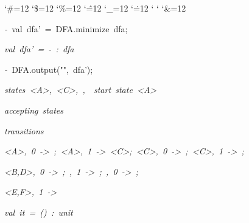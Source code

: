 \begin{list}{}
{\setlength{\leftmargin}{\leftmargini}
\setlength{\rightmargin}{0cm}
\setlength{\itemindent}{0cm}
\setlength{\listparindent}{0cm}
\setlength{\itemsep}{0cm}
\setlength{\parsep}{0cm}
\setlength{\labelsep}{0cm}
\setlength{\labelwidth}{0cm}
\catcode`\#=12
\catcode`\$=12
\catcode`\%=12
\catcode`\^=12
\catcode`\_=12
\catcode`\.=12
\catcode`
\catcode`
\catcode`\&=12
\ttfamily}
\small
\item[]\textsl{-\ }val\ dfa'\ =\ DFA.minimize\ dfa;
\item[]\textsl{val\ dfa'\ =\ -\ :\ dfa}
\item[]\textsl{-\ }DFA.output("",\ dfa');
\item[]\textsl{states\ <A>,\ <C>,\ <B,D>,\ <E,F>\ start\ state\ <A>}
\item[]\textsl{accepting\ states\ <E,F>}
\item[]\textsl{transitions}
\item[]\textsl{<A>,\ 0\ ->\ <B,D>;\ <A>,\ 1\ ->\ <C>;\ <C>,\ 0\ ->\ <B,D>;\ <C>,\ 1\ ->\ <B,D>;}
\item[]\textsl{<B,D>,\ 0\ ->\ <B,D>;\ <B,D>,\ 1\ ->\ <E,F>;\ <E,F>,\ 0\ ->\ <E,F>;}
\item[]\textsl{<E,F>,\ 1\ ->\ <E,F>}
\item[]\textsl{val\ it\ =\ ()\ :\ unit}
\end{list}
